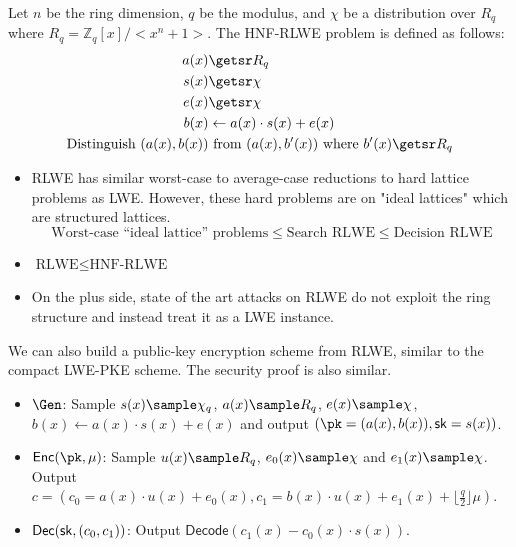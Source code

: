 \begin{definition}
    Let $n$ be the ring dimension, $q$ be the modulus, and $\chi$ be a distribution over $R_q$ where $R_q = \mathbb{Z}_q[x]/<x^n + 1>$. The HNF-RLWE problem is defined as follows:  
    \begin{align*}
        a(x) &\getsr R_q \\
        s(x) &\getsr \chi \\
        e(x) &\getsr \chi \\
        b(x) &\gets a(x) \cdot s(x) + e(x) \\
        \text{Distinguish } (a(x), b(x)) &\text{ from } (a(x), b'(x)) \text{ where } b'(x) \getsr R_q 
    \end{align*}
\end{definition}
\begin{itemize}
    \item RLWE has similar worst-case to average-case reductions to hard lattice problems as LWE. However, these hard problems are on "ideal lattices" which are structured lattices. 
    $$\text{Worst-case ``ideal lattice'' problems} \leq \text{Search RLWE} \leq \text{Decision RLWE}$$

    \item $\text{RLWE} \leq \text{HNF-RLWE}$
    \item On the plus side, state of the art attacks on RLWE do not exploit the ring structure and instead treat it as a LWE instance.
\end{itemize}

We can also build a public-key encryption scheme from RLWE, similar to the compact LWE-PKE scheme. The security proof is also similar.
\begin{construction}
    \hfill
    \begin{itemize}
        \item $\Gen$: Sample $s(x) \sample \chi_q$, $a(x) \sample R_q$, $e(x) \sample \chi$, $b(x) \gets a(x) \cdot s(x) + e(x)$ and output $(\pk = (a(x),b(x)), \sk = s(x))$.
        \item $\Enc(\pk, \mu)$: Sample $u(x) \sample R_q$, $e_0(x) \sample \chi$ and $e_1(x) \sample \chi$. Output $c = (c_0 = a(x) \cdot u(x) + e_0(x),c_1 =  b(x) \cdot u(x) + e_1(x) + \lfloor\frac{q}{2}\rfloor\mu)$.
        \item $\mathsf{Dec}(\mathsf{sk}, (c_0,c_1))$: Output $\mathsf{Decode}(c_1(x) - c_0(x) \cdot s(x))$.
    \end{itemize}
\end{construction}

